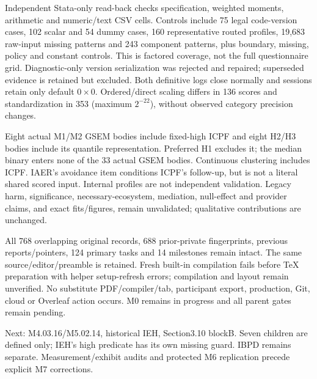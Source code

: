 \documentclass[11pt,a4paper]{article}
\begin{document}
Independent Stata-only read-back checks specification, weighted
moments, arithmetic and numeric/text CSV cells.
Controls include 75 legal code-version cases, 102 scalar and
54 dummy cases, 160 representative routed profiles, 19,683 raw-input
missing patterns and 243 component patterns, plus boundary,
missing, policy and constant controls.
This is factored coverage, not the full questionnaire grid.
Diagnostic-only version serialization was rejected and repaired;
superseded evidence is retained but excluded.
Both definitive logs close normally and sessions retain only
default \(0\times0\).
Ordered/direct scaling differs in 136 scores and standardization
in 353 (maximum $2^{-22}$), without observed category precision changes.

Eight actual M1/M2 GSEM bodies include fixed-high ICPF and eight
H2/H3 bodies include its quantile representation.
Preferred H1 excludes it; the median binary enters none of the
33 actual GSEM bodies. Continuous clustering includes ICPF.
IAER's avoidance item conditions ICPF's follow-up, but is not
a literal shared scored input.
Internal profiles are not independent validation.
Legacy harm, significance, necessary-ecosystem, mediation,
null-effect and provider claims, and exact fits/figures,
remain unvalidated; qualitative contributions are unchanged.

All 768 overlapping original records, 688 prior-private fingerprints,
previous reports/pointers, 124 primary tasks and 14 milestones
remain intact. The same source/editor/preamble is retained.
Fresh built-in compilation fails before TeX preparation with
helper setup-refresh errors; compilation and layout remain
unverified. No substitute PDF/compiler/tab, participant export,
production, Git, cloud or Overleaf action occurs.
M0 remains in progress and all parent gates remain pending.

Next: M4.03.16/M5.02.14, historical IEH, Section3.10 blockB.
Seven children are defined only; IEH's high predicate has its
own missing guard. IBPD remains separate.
Measurement/exhibit audits and protected M6 replication
precede explicit M7 corrections.
\end{document}
